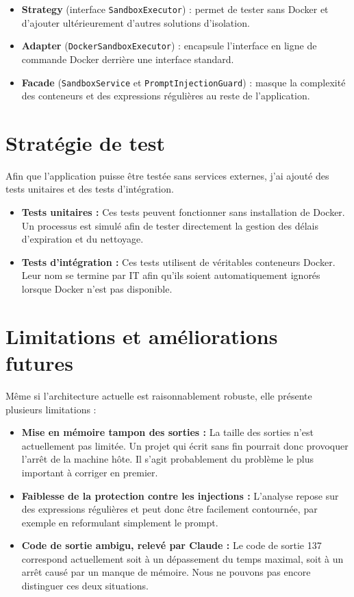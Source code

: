 \documentclass[11pt,a4paper]{article}
\begin{document}
\begin{itemize}
    \item \textbf{Strategy} (interface \texttt{SandboxExecutor}) : permet de tester sans Docker et d'ajouter ultérieurement d'autres solutions d'isolation.
    \item \textbf{Adapter} (\texttt{DockerSandboxExecutor}) : encapsule l'interface en ligne de commande Docker derrière une interface standard.
    \item \textbf{Facade} (\texttt{SandboxService} et \texttt{PromptInjectionGuard}) : masque la complexité des conteneurs et des expressions régulières au reste de l'application.
\end{itemize}

\section{Stratégie de test}
Afin que l'application puisse être testée sans services externes, j'ai ajouté des tests unitaires et des tests d'intégration.
\begin{itemize}
    \item \textbf{Tests unitaires :} Ces tests peuvent fonctionner sans installation de Docker. Un processus est simulé afin de tester directement la gestion des délais d'expiration et du nettoyage.
    \item \textbf{Tests d'intégration :} Ces tests utilisent de véritables conteneurs Docker. Leur nom se termine par IT afin qu'ils soient automatiquement ignorés lorsque Docker n'est pas disponible.
\end{itemize}

\section{Limitations et améliorations futures}
Même si l'architecture actuelle est raisonnablement robuste, elle présente plusieurs limitations :
\begin{itemize}
    \item \textbf{Mise en mémoire tampon des sorties :} La taille des sorties n'est actuellement pas limitée. Un projet qui écrit sans fin pourrait donc provoquer l'arrêt de la machine hôte. Il s'agit probablement du problème le plus important à corriger en premier.
    \item \textbf{Faiblesse de la protection contre les injections :} L'analyse repose sur des expressions régulières et peut donc être facilement contournée, par exemple en reformulant simplement le prompt.
    \item \textbf{Code de sortie ambigu, relevé par Claude :} Le code de sortie 137 correspond actuellement soit à un dépassement du temps maximal, soit à un arrêt causé par un manque de mémoire. Nous ne pouvons pas encore distinguer ces deux situations.
\end{itemize}
\endgroup
\end{document}
